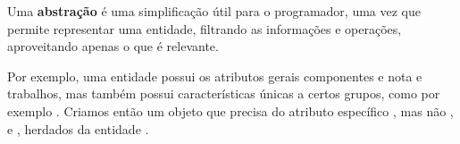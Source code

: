 Uma \textbf{abstração} é uma simplificação útil para o programador, uma vez que
permite representar uma entidade, filtrando as informações e operações,
aproveitando apenas o que é relevante.

Por exemplo, uma entidade  possui os atributos gerais
componentes e nota e trabalhos, mas também possui características únicas a
certos grupos, como por exemplo . Criamos então um objeto
 que precisa do atributo específico , mas não
,  e , herdados da entidade
.

